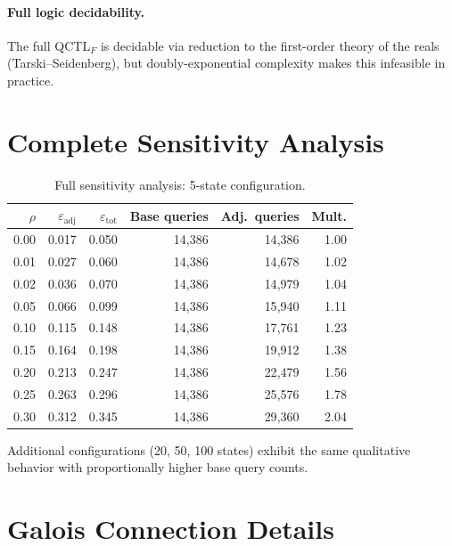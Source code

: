 \documentclass[11pt]{article}
\newcommand{\qctlf}{QCTL$_F$}
\begin{document}
\paragraph{Full logic decidability.}
The full \qctlf{} is decidable via reduction to the first-order
theory of the reals (Tarski--Seidenberg), but doubly-exponential
complexity makes this infeasible in practice.

\section{Complete Sensitivity Analysis}\label{app:sensitivity}

\begin{table}[h]
\centering
\caption{Full sensitivity analysis: 5-state configuration.}
\label{tab:sensitivity_full}
\small
\begin{tabular}{@{}rrrrrr@{}}
\toprule
$\rho$ & $\varepsilon_{\mathrm{adj}}$ & $\varepsilon_{\mathrm{tot}}$
  & Base queries & Adj.\ queries & Mult. \\
\midrule
0.00 & 0.017 & 0.050 & 14{,}386 & 14{,}386 & 1.00 \\
0.01 & 0.027 & 0.060 & 14{,}386 & 14{,}678 & 1.02 \\
0.02 & 0.036 & 0.070 & 14{,}386 & 14{,}979 & 1.04 \\
0.05 & 0.066 & 0.099 & 14{,}386 & 15{,}940 & 1.11 \\
0.10 & 0.115 & 0.148 & 14{,}386 & 17{,}761 & 1.23 \\
0.15 & 0.164 & 0.198 & 14{,}386 & 19{,}912 & 1.38 \\
0.20 & 0.213 & 0.247 & 14{,}386 & 22{,}479 & 1.56 \\
0.25 & 0.263 & 0.296 & 14{,}386 & 25{,}576 & 1.78 \\
0.30 & 0.312 & 0.345 & 14{,}386 & 29{,}360 & 2.04 \\
\bottomrule
\end{tabular}
\end{table}

Additional configurations (20, 50, 100 states) exhibit the same
qualitative behavior with proportionally higher base query counts.

\section{Galois Connection Details}\label{app:galois}
\end{document}
